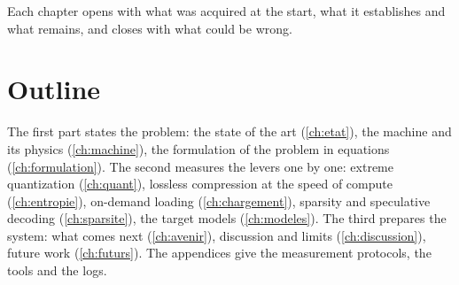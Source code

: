 Each chapter opens with what was acquired at the start, what it establishes and what remains, and closes with what could be wrong.

\section{Outline}

The first part states the problem: the state of the art (\cref{ch:etat}), the machine and its physics (\cref{ch:machine}), the formulation of the problem in equations (\cref{ch:formulation}). The second measures the levers one by one: extreme quantization (\cref{ch:quant}), lossless compression at the speed of compute (\cref{ch:entropie}), on-demand loading (\cref{ch:chargement}), sparsity and speculative decoding (\cref{ch:sparsite}), the target models (\cref{ch:modeles}). The third prepares the system: what comes next (\cref{ch:avenir}), discussion and limits (\cref{ch:discussion}), future work (\cref{ch:futurs}). The appendices give the measurement protocols, the tools and the logs.
